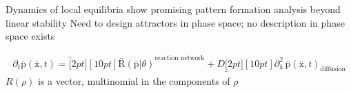 \documentclass[a0,portrait]{a0poster}
\begin{document}
\begin{itemize}[leftmargin=5cm]
	\up Dynamics of local equilibria show promising pattern formation analysis beyond linear stability \cite{Halatek2018}
	\down Need to design attractors in phase space; no description in phase space exists
\end{itemize}

\begin{align*}
	\partial_t\bar{\mathrm{p}}(\bar{\mathrm{x}},t)=
	\!\!\!\!\!\!\!\!\!\!\!
	\overbracket[2pt][10pt]{\bar{\mathrm{R}}(\bar{\mathrm{p}}|\theta)}^{\text{reaction network}}
	\!\!\!\!\!\!\!\!\!\!\!+D
	\underbracket[2pt][10pt]{\partial_{\bar{\mathrm{x}}}^2\,
	\bar{\mathrm{p}}(\bar{\mathrm{x}},t)}_{\text{diffusion}}
\end{align*}
$R(\rho)$ is a vector, multinomial in the components of $\rho$

\vfill\tiny

\begin{minipage}[t][][b]{0.99\textwidth}
	
	
\end{minipage}
\end{document}
